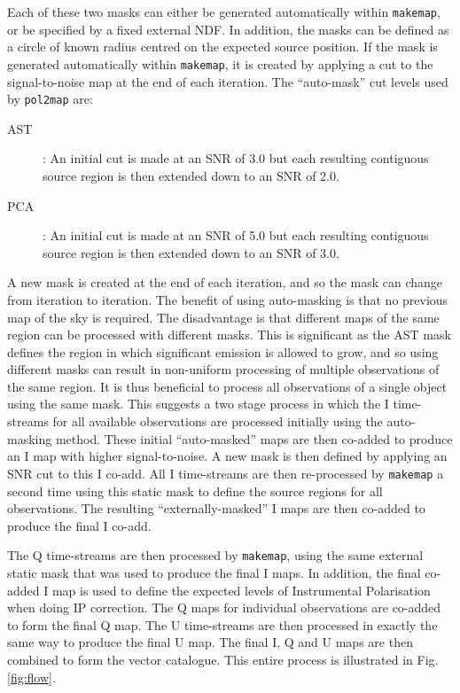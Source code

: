 \documentclass[twoside,11pt]{starlink}
\begin{document}
Each of these two masks can either be generated automatically within
\texttt{makemap}, or be specified by a fixed external NDF. In addition,
the masks can be defined as a circle of known radius centred on the
expected source position. If the mask is generated automatically within
\texttt{makemap}, it is created by applying a cut to the signal-to-noise map
at the end of each iteration. The ``auto-mask'' cut levels used by
\texttt{pol2map} are:

\begin{description}
\item[AST]: An initial cut is made at an SNR of 3.0 but each resulting
contiguous source region is then extended down to an SNR of 2.0.
\item[PCA]: An initial cut is made at an SNR of 5.0 but each resulting
contiguous source region is then extended down to an SNR of 3.0.
\end{description}

A new mask is created at the end of each iteration, and so the mask can
change from iteration to iteration. The benefit of using auto-masking is
that no previous map of the sky is required. The disadvantage is that
different maps of the same region can be processed with different masks.
This is significant as the AST mask defines the region in which
significant emission is allowed to grow, and so using different masks can
result in non-uniform processing of multiple observations of the same
region. It is thus beneficial to process all observations of a single
object using the same mask. This suggests a two stage process in which
the I time-streams for all available observations are processed initially
using the auto-masking method. These initial ``auto-masked'' maps are
then co-added to produce an I map with higher signal-to-noise. A new mask
is then defined by applying an SNR cut to this I co-add. All I
time-streams are then re-processed by \texttt{makemap} a second time
using this static mask to define the source regions for all observations.
The resulting ``externally-masked'' I maps are then co-added to produce
the final I co-add.

The Q time-streams are then processed by \texttt{makemap}, using the same
external static mask that was used to produce the final I maps. In
addition, the final co-added I map is used to define the expected levels
of Instrumental Polarisation when doing IP correction. The Q maps for
individual observations are co-added to form the final Q map. The U
time-streams are then processed in exactly the same way to produce the
final U map. The final I, Q and U maps are then combined to form the
vector catalogue. This entire process is illustrated in
Fig.\ref{fig:flow}.
\end{document}
